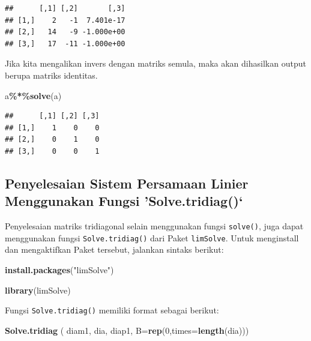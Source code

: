 \documentclass[
]{book}
\newenvironment{Shaded}{\begin{snugshade}}{\end{snugshade}}
\newcommand{\AttributeTok}[1]{\textcolor[rgb]{0.13,0.29,0.53}{#1}}
\newcommand{\DecValTok}[1]{\textcolor[rgb]{0.00,0.00,0.81}{#1}}
\newcommand{\FunctionTok}[1]{\textcolor[rgb]{0.13,0.29,0.53}{\textbf{#1}}}
\newcommand{\NormalTok}[1]{#1}
\newcommand{\SpecialCharTok}[1]{\textcolor[rgb]{0.81,0.36,0.00}{\textbf{#1}}}
\newcommand{\StringTok}[1]{\textcolor[rgb]{0.31,0.60,0.02}{#1}}
\theoremstyle{definition}
\theoremstyle{definition}
\theoremstyle{definition}
\theoremstyle{definition}
\theoremstyle{remark}
\begin{document}
\begin{verbatim}
##      [,1] [,2]       [,3]
## [1,]    2   -1  7.401e-17
## [2,]   14   -9 -1.000e+00
## [3,]   17  -11 -1.000e+00
\end{verbatim}

Jika kita mengalikan invers dengan matriks semula, maka akan dihasilkan output berupa matriks identitas.

\begin{Shaded}
\begin{Highlighting}[]
\NormalTok{a}\SpecialCharTok{\%*\%}\FunctionTok{solve}\NormalTok{(a)}
\end{Highlighting}
\end{Shaded}

\begin{verbatim}
##      [,1] [,2] [,3]
## [1,]    1    0    0
## [2,]    0    1    0
## [3,]    0    0    1
\end{verbatim}

\hypertarget{solvetridiagfunct}{%
\subsection{Penyelesaian Sistem Persamaan Linier Menggunakan Fungsi 'Solve.tridiag()`}\label{solvetridiagfunct}}

Penyelesaian matriks tridiagonal selain menggunakan fungsi \texttt{solve()}, juga dapat menggunakan fungsi \texttt{Solve.tridiag()} dari Paket \texttt{limSolve}. Untuk menginstall dan mengaktifkan Paket tersebut, jalankan sintaks berikut:

\begin{Shaded}
\begin{Highlighting}[]
\FunctionTok{install.packages}\NormalTok{(}\StringTok{"limSolve"}\NormalTok{)}
\end{Highlighting}
\end{Shaded}

\begin{Shaded}
\begin{Highlighting}[]
\FunctionTok{library}\NormalTok{(limSolve)}
\end{Highlighting}
\end{Shaded}

Fungsi \texttt{Solve.tridiag()} memiliki format sebagai berikut:

\begin{Shaded}
\begin{Highlighting}[]
\FunctionTok{Solve.tridiag}\NormalTok{ ( diam1, dia, diap1, }\AttributeTok{B=}\FunctionTok{rep}\NormalTok{(}\DecValTok{0}\NormalTok{,}\AttributeTok{times=}\FunctionTok{length}\NormalTok{(dia)))}
\end{Highlighting}
\end{Shaded}
\end{document}
